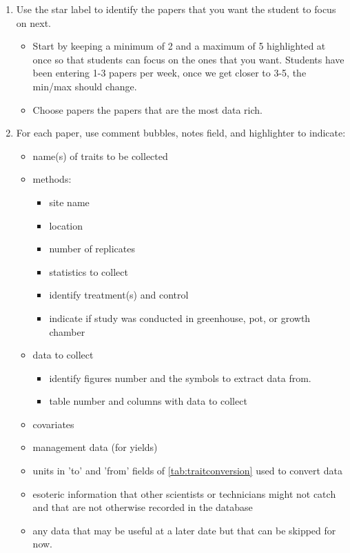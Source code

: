 \documentclass[12pt,english,portrait]{article}
\begin{document}
\begin{enumerate}
\item Use the star label to identify the papers that you want the student to focus on next.

\begin{itemize}
\item Start by keeping a minimum of 2 and a maximum of 5 highlighted at once so that students can focus on the ones that you want. Students have been entering 1-3 papers per week, once we get closer to 3-5, the min/max should change.
\item Choose papers the papers that are the most data rich.
\end{itemize}

\item For each paper, use comment bubbles, notes field, and highlighter to indicate:

\begin{itemize}
\item name(s) of traits to be collected
\item methods:

\begin{itemize}
\item site name
\item location
\item number of replicates
\item statistics to collect
\item identify treatment(s) and control
\item indicate if study was conducted in greenhouse, pot, or growth chamber
\end{itemize}

\item data to collect

\begin{itemize}
\item identify figures number and the symbols to extract data from.
\item table number and columns with data to collect
\end{itemize}

\item covariates
\item management data (for yields)
\item units in 'to' and 'from' fields of \autoref{tab:traitconversion} used to convert data
\item esoteric information that other scientists or technicians might not catch and that are not otherwise recorded in the database
\item any data that may be useful at a later date but that can be skipped for now.
\end{itemize}

\end{enumerate}
\end{document}
